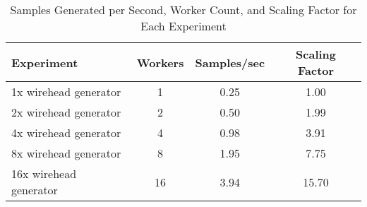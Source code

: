 
\begin{table}[h]
\centering
\begin{tabular}{lccc}
\hline
Experiment & Workers & Samples/sec & Scaling Factor \\
\hline
1x wirehead generator & 1 & 0.25 & 1.00 \\
2x wirehead generator & 2 & 0.50 & 1.99 \\
4x wirehead generator & 4 & 0.98 & 3.91 \\
8x wirehead generator & 8 & 1.95 & 7.75 \\
16x wirehead generator & 16 & 3.94 & 15.70 \\
\hline
\end{tabular}
\caption{Samples Generated per Second, Worker Count, and Scaling Factor for Each Experiment}
\label{tab:samples_generated}
\end{table}
